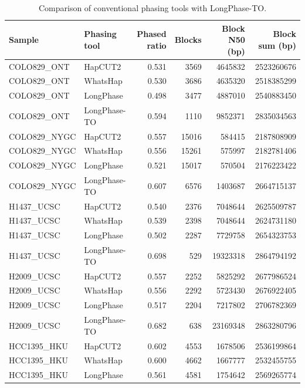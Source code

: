 \documentclass[pdflatex,sn-nature]{sn-jnl}
\begin{document}
\begin{table}[htbp]
  \centering
  \caption{Comparison of conventional phasing tools with LongPhase-TO.}
  \label{tab:phasing-performance}
  \begin{tabular}{@{}llrrrr@{}}
    \toprule
    Sample & Phasing tool & Phased ratio & Blocks & Block N50 (bp) & Block sum (bp) \\
    \midrule
    COLO829\_ONT & HapCUT2      & 0.531 & 3569  & 4645832  & 2523260676 \\
    COLO829\_ONT & WhatsHap     & 0.530 & 3686  & 4635320  & 2518385299 \\
    COLO829\_ONT & LongPhase    & 0.498 & 3477  & 4887010  & 2540883450 \\
    COLO829\_ONT & LongPhase-TO & 0.594 & 1110  & 9852371  & 2835034563 \\
    \addlinespace
    COLO829\_NYGC & HapCUT2      & 0.557 & 15016 & 584415   & 2187808909 \\
    COLO829\_NYGC & WhatsHap     & 0.556 & 15261 & 575997   & 2182781406 \\
    COLO829\_NYGC & LongPhase    & 0.521 & 15017 & 570504   & 2176223422 \\
    COLO829\_NYGC & LongPhase-TO & 0.607 & 6576  & 1403687  & 2664715137 \\
    \addlinespace
    H1437\_UCSC & HapCUT2      & 0.540 & 2376  & 7048644  & 2625509787 \\
    H1437\_UCSC & WhatsHap     & 0.539 & 2398  & 7048644  & 2624731180 \\
    H1437\_UCSC & LongPhase    & 0.502 & 2287  & 7729758  & 2654323753 \\
    H1437\_UCSC & LongPhase-TO & 0.698 & 529   & 19323318 & 2864794192 \\
    \addlinespace
    H2009\_UCSC & HapCUT2      & 0.557 & 2252  & 5825292  & 2677986524 \\
    H2009\_UCSC & WhatsHap     & 0.556 & 2292  & 5723430  & 2676922405 \\
    H2009\_UCSC & LongPhase    & 0.517 & 2204  & 7217802  & 2706782369 \\
    H2009\_UCSC & LongPhase-TO & 0.682 & 638   & 23169348 & 2863280796 \\
    \addlinespace
    HCC1395\_HKU & HapCUT2      & 0.602 & 4553  & 1678506  & 2536199864 \\
    HCC1395\_HKU & WhatsHap     & 0.600 & 4662  & 1667777  & 2532455755 \\
    HCC1395\_HKU & LongPhase    & 0.561 & 4581  & 1754642  & 2569265774 \\

\end{tabular}
\end{table}
\end{document}

